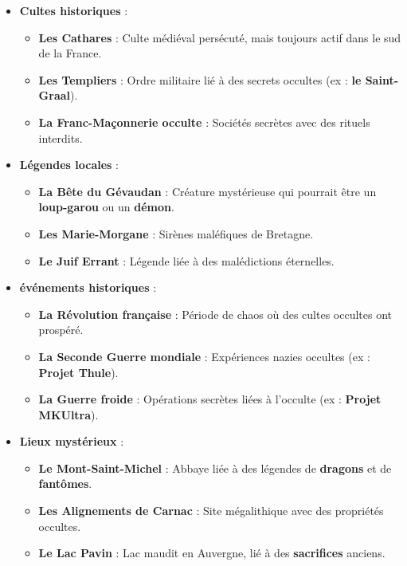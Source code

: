 \documentclass[10pt,a5paper,twoside]{book}
\begin{document}
\begin{itemize}
	\item \textbf{Cultes historiques} :
	\begin{itemize}
		\item \textbf{Les Cathares} : Culte médiéval persécuté, mais toujours actif dans le sud de la France.
		\item \textbf{Les Templiers} : Ordre militaire lié à des secrets occultes (ex : \textbf{le Saint-Graal}).
		\item \textbf{La Franc-Maçonnerie occulte} : Sociétés secrètes avec des rituels interdits.
	\end{itemize}
	\item \textbf{Légendes locales} :
	\begin{itemize}
		\item \textbf{La Bête du Gévaudan} : Créature mystérieuse qui pourrait être un \textbf{loup-garou} ou un \textbf{démon}.
		\item \textbf{Les Marie-Morgane} : Sirènes maléfiques de Bretagne.
		\item \textbf{Le Juif Errant} : Légende liée à des malédictions éternelles.
	\end{itemize}
	\item \textbf{événements historiques} :
	\begin{itemize}
		\item \textbf{La Révolution française} : Période de chaos où des cultes occultes ont prospéré.
		\item \textbf{La Seconde Guerre mondiale} : Expériences nazies occultes (ex : \textbf{Projet Thule}).
		\item \textbf{La Guerre froide} : Opérations secrètes liées à l'occulte (ex : \textbf{Projet MKUltra}).
	\end{itemize}
	\item \textbf{Lieux mystérieux} :
	\begin{itemize}
		\item \textbf{Le Mont-Saint-Michel} : Abbaye liée à des légendes de \textbf{dragons} et de \textbf{fantômes}.
		\item \textbf{Les Alignements de Carnac} : Site mégalithique avec des propriétés occultes.
		\item \textbf{Le Lac Pavin} : Lac maudit en Auvergne, lié à des \textbf{sacrifices} anciens.
	\end{itemize}
\end{itemize}

\newpage
\end{document}
